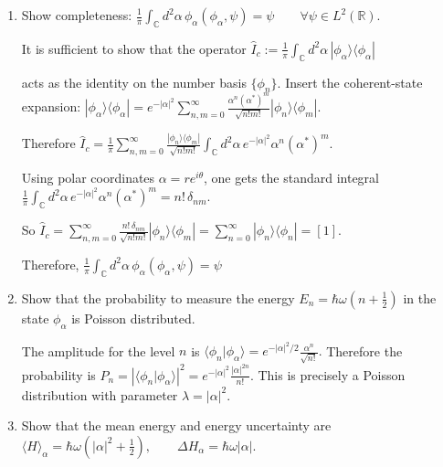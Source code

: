 \documentclass[11pt,a4paper]{scrartcl}
\newcommand{\R}{\mathbb{R}}
\newcommand{\abs}[1]{\left| #1 \right|}
\begin{document}
\begin{enumerate}[label=(\alph*)]
    \item Show completeness:
    $
    \frac1\pi\int_{\mathbb{C}} d^2\alpha\, \phi_\alpha(\phi_\alpha,\psi)=\psi
    \qquad \forall \psi\in L^2(\R).
    $

    \begin{calculationbox}
    It is sufficient to show that the operator $\hat I_c := \frac1\pi\int_{\mathbb{C}} d^2\alpha\, |\phi_\alpha\rangle\langle \phi_\alpha|$
    
    acts as the identity on the number basis $\{\phi_n\}$. Insert the coherent-state expansion:
    $
        |\phi_\alpha\rangle\langle \phi_\alpha|
        = e^{-|\alpha|^2}
        \sum_{n,m=0}^{\infty}
        \frac{\alpha^n(\alpha^*)^m}{\sqrt{n!m!}}
        |\phi_n\rangle\langle\phi_m|.
    $
    
    Therefore $\hat I_c
        = \frac1\pi \sum_{n,m=0}^{\infty}
        \frac{|\phi_n\rangle\langle\phi_m|}{\sqrt{n!m!}}
        \int_{\mathbb{C}} d^2\alpha\,
        e^{-|\alpha|^2}\alpha^n(\alpha^*)^m.
    $

    Using polar coordinates $\alpha=re^{i\theta}$, one gets the standard integral
    $
    \frac1\pi\int_{\mathbb{C}} d^2\alpha\,
    e^{-|\alpha|^2}\alpha^n(\alpha^*)^m
    = n!\,\delta_{nm}.
    $

    So $\hat I_c
        = \sum_{n,m=0}^{\infty}
        \frac{n!\,\delta_{nm}}{\sqrt{n!m!}}
        |\phi_n\rangle\langle\phi_m|
        = \sum_{n=0}^{\infty} |\phi_n\rangle\langle\phi_n|
        = [1].
    $

    Therefore,
    $
    \frac1\pi\int_{\mathbb{C}} d^2\alpha\, \phi_\alpha(\phi_\alpha,\psi)=\psi
    $
    \end{calculationbox}

    \item Show that the probability to measure the energy
    $E_n=\hbar\omega\left(n+\frac12\right)$
    in the state $\phi_\alpha$ is Poisson distributed.

    \begin{solutionbox}
    The amplitude for the level $n$ is
    $
    \langle \phi_n|\phi_\alpha\rangle
    = e^{-|\alpha|^2/2}\frac{\alpha^n}{\sqrt{n!}}.
    $
    Therefore the probability is
    $P_n= \abs{\langle \phi_n|\phi_\alpha\rangle}^2 = e^{-|\alpha|^2}\frac{|\alpha|^{2n}}{n!}$.
    This is precisely a Poisson distribution with parameter
    $
    \lambda=|\alpha|^2.
    $
    \end{solutionbox}

    \item Show that the mean energy and energy uncertainty are
    $
    \langle H\rangle_\alpha = \hbar\omega\left(|\alpha|^2+\frac12\right),
    \qquad
    \Delta H_\alpha = \hbar\omega |\alpha|.
    $


\end{enumerate}
\end{document}
